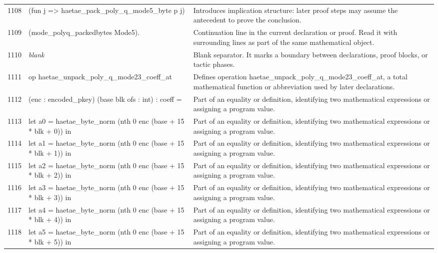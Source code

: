 \documentclass[10pt]{article}
\begin{document}
\begin{longtable}{r L{0.53\textwidth} L{0.37\textwidth}}
1108 & {\ttfamily\scriptsize       (fun j => haetae\_pack\_poly\_q\_mode5\_byte p j)} & Introduces implication structure: later proof steps may assume the antecedent to prove the conclusion. \\
1109 & {\ttfamily\scriptsize       (mode\_polyq\_packedbytes Mode5).} & Continuation line in the current declaration or proof.  Read it with surrounding lines as part of the same mathematical object. \\
1110 & {\ttfamily\scriptsize \emph{blank}} & Blank separator.  It marks a boundary between declarations, proof blocks, or tactic phases. \\
1111 & {\ttfamily\scriptsize op haetae\_unpack\_poly\_q\_mode23\_coeff\_at} & Defines operation haetae\_unpack\_poly\_q\_mode23\_coeff\_at, a total mathematical function or abbreviation used by later declarations. \\
1112 & {\ttfamily\scriptsize    (enc : encoded\_pkey) (base blk ofs : int) : coeff =} & Part of an equality or definition, identifying two mathematical expressions or assigning a program value. \\
1113 & {\ttfamily\scriptsize   let a0 = haetae\_byte\_norm (nth 0 enc (base + 15 * blk + 0)) in} & Part of an equality or definition, identifying two mathematical expressions or assigning a program value. \\
1114 & {\ttfamily\scriptsize   let a1 = haetae\_byte\_norm (nth 0 enc (base + 15 * blk + 1)) in} & Part of an equality or definition, identifying two mathematical expressions or assigning a program value. \\
1115 & {\ttfamily\scriptsize   let a2 = haetae\_byte\_norm (nth 0 enc (base + 15 * blk + 2)) in} & Part of an equality or definition, identifying two mathematical expressions or assigning a program value. \\
1116 & {\ttfamily\scriptsize   let a3 = haetae\_byte\_norm (nth 0 enc (base + 15 * blk + 3)) in} & Part of an equality or definition, identifying two mathematical expressions or assigning a program value. \\
1117 & {\ttfamily\scriptsize   let a4 = haetae\_byte\_norm (nth 0 enc (base + 15 * blk + 4)) in} & Part of an equality or definition, identifying two mathematical expressions or assigning a program value. \\
1118 & {\ttfamily\scriptsize   let a5 = haetae\_byte\_norm (nth 0 enc (base + 15 * blk + 5)) in} & Part of an equality or definition, identifying two mathematical expressions or assigning a program value. \\

\end{longtable}
\end{document}
